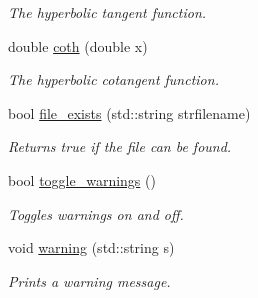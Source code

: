 \begin{DoxyCompactItemize}
\begin{DoxyCompactList}\small\item\em The hyperbolic tangent function. \end{DoxyCompactList}\item 
\hypertarget{namespacepyne_a03cad3093b97f2f6a5dcb5cdc4cb562e}{double \hyperlink{namespacepyne_a03cad3093b97f2f6a5dcb5cdc4cb562e}{coth} (double x)}\label{namespacepyne_a03cad3093b97f2f6a5dcb5cdc4cb562e}

\begin{DoxyCompactList}\small\item\em The hyperbolic cotangent function. \end{DoxyCompactList}\item 
\hypertarget{namespacepyne_ad514c252885b18fb9c6ef3ac5f0ac680}{bool \hyperlink{namespacepyne_ad514c252885b18fb9c6ef3ac5f0ac680}{file\-\_\-exists} (std\-::string strfilename)}\label{namespacepyne_ad514c252885b18fb9c6ef3ac5f0ac680}

\begin{DoxyCompactList}\small\item\em Returns true if the file can be found. \end{DoxyCompactList}\item 
\hypertarget{namespacepyne_a6dea834f084c2ff3a3c8ce67c3eaf8e1}{bool \hyperlink{namespacepyne_a6dea834f084c2ff3a3c8ce67c3eaf8e1}{toggle\-\_\-warnings} ()}\label{namespacepyne_a6dea834f084c2ff3a3c8ce67c3eaf8e1}

\begin{DoxyCompactList}\small\item\em Toggles warnings on and off. \end{DoxyCompactList}\item 
\hypertarget{namespacepyne_ab952e7e8ee07bf181ad5439e27ae1604}{void \hyperlink{namespacepyne_ab952e7e8ee07bf181ad5439e27ae1604}{warning} (std\-::string s)}\label{namespacepyne_ab952e7e8ee07bf181ad5439e27ae1604}

\begin{DoxyCompactList}\small\item\em Prints a warning message. \end{DoxyCompactList}\end{DoxyCompactItemize}
